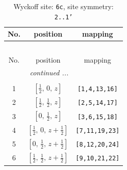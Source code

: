 \documentclass[fleqn,8pt]{jsarticle}
\begin{document}
\renewcommand{\arraystretch}{1.2}
\begin{longtable}{ccc}
\caption{Wyckoff site: {\tt 6c}, site symmetry: {\tt 2..1'}}
 \\
 \hline \hline
No. & position & mapping \\ \hline \endfirsthead

\multicolumn{2}{l}{\tablename\ \thetable{}} \\
 \hline \hline
No. & position & mapping \\ \hline \endhead

 \hline \hline
\multicolumn{2}{r}{\footnotesize\it continued ...} \\ \endfoot

 \hline \hline
\multicolumn{2}{r}{} \\ \endlastfoot

1 & $\left[ \frac{1}{2},\, 0,\, z \right]$ & {\tt [1,4,13,16]} \\ \hline
2 & $\left[ \frac{1}{2},\, \frac{1}{2},\, z \right]$ & {\tt [2,5,14,17]} \\ \hline
3 & $\left[ 0,\, \frac{1}{2},\, z \right]$ & {\tt [3,6,15,18]} \\ \hline
4 & $\left[ \frac{1}{2},\, 0,\, z + \frac{1}{2} \right]$ & {\tt [7,11,19,23]} \\ \hline
5 & $\left[ 0,\, \frac{1}{2},\, z + \frac{1}{2} \right]$ & {\tt [8,12,20,24]} \\ \hline
6 & $\left[ \frac{1}{2},\, \frac{1}{2},\, z + \frac{1}{2} \right]$ & {\tt [9,10,21,22]} \\
\end{longtable}
\renewcommand{\arraystretch}{1.2}
\end{document}
